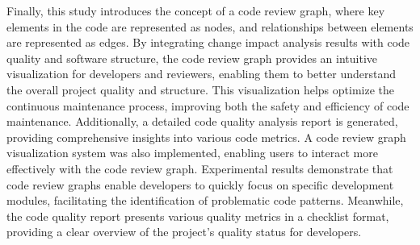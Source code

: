 \begin{eabstract}
Finally, this study introduces the concept of a code review graph, where key elements in the code are represented as nodes, and relationships between elements are represented as edges. By integrating change impact analysis results with code quality and software structure, the code review graph provides an intuitive visualization for developers and reviewers, enabling them to better understand the overall project quality and structure. This visualization helps optimize the continuous maintenance process, improving both the safety and efficiency of code maintenance. Additionally, a detailed code quality analysis report is generated, providing comprehensive insights into various code metrics. A code review graph visualization system was also implemented, enabling users to interact more effectively with the code review graph. Experimental results demonstrate that code review graphs enable developers to quickly focus on specific development modules, facilitating the identification of problematic code patterns. Meanwhile, the code quality report presents various quality metrics in a checklist format, providing a clear overview of the project's quality status for developers.
\end{eabstract}
